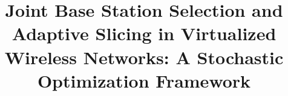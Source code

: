 \documentclass[onecolumn,draftcls]{IEEEtran}
\begin{document}
%
\title{Joint Base Station Selection and Adaptive Slicing in Virtualized Wireless Networks: A Stochastic Optimization Framework}

\author{
}

\end{document}
